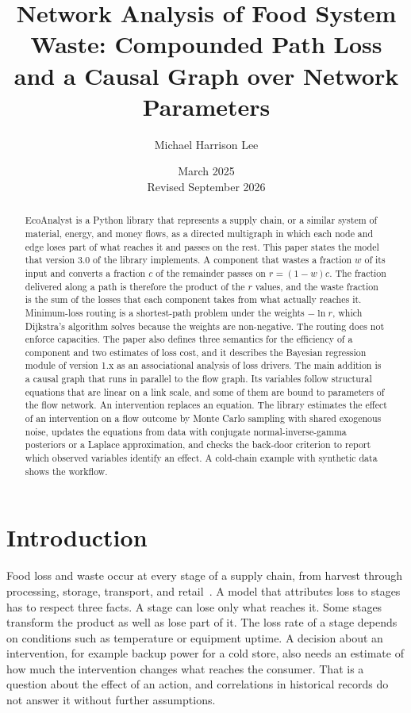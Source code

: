 \documentclass[12pt]{article}
\title{Network Analysis of Food System Waste: Compounded Path Loss and a Causal Graph over Network Parameters}
\author{Michael Harrison Lee}
\date{March 2025\\[2pt] Revised September 2026}
\theoremstyle{plain}
\theoremstyle{definition}
\begin{document}
\maketitle

\begin{abstract}
EcoAnalyst is a Python library that represents a supply chain, or a similar system of material, energy, and money flows, as a directed multigraph in which each node and edge loses part of what reaches it and passes on the rest. This paper states the model that version 3.0 of the library implements. A component that wastes a fraction $w$ of its input and converts a fraction $c$ of the remainder passes on $r=(1-w)c$. The fraction delivered along a path is therefore the product of the $r$ values, and the waste fraction is the sum of the losses that each component takes from what actually reaches it. Minimum-loss routing is a shortest-path problem under the weights $-\ln r$, which Dijkstra's algorithm solves because the weights are non-negative. The routing does not enforce capacities. The paper also defines three semantics for the efficiency of a component and two estimates of loss cost, and it describes the Bayesian regression module of version 1.x as an associational analysis of loss drivers. The main addition is a causal graph that runs in parallel to the flow graph. Its variables follow structural equations that are linear on a link scale, and some of them are bound to parameters of the flow network. An intervention replaces an equation. The library estimates the effect of an intervention on a flow outcome by Monte Carlo sampling with shared exogenous noise, updates the equations from data with conjugate normal-inverse-gamma posteriors or a Laplace approximation, and checks the back-door criterion to report which observed variables identify an effect. A cold-chain example with synthetic data shows the workflow.
\end{abstract}

\section{Introduction}

Food loss and waste occur at every stage of a supply chain, from harvest through processing, storage, transport, and retail~\cite{supply_chain_waste}. A model that attributes loss to stages has to respect three facts. A stage can lose only what reaches it. Some stages transform the product as well as lose part of it. The loss rate of a stage depends on conditions such as temperature or equipment uptime. A decision about an intervention, for example backup power for a cold store, also needs an estimate of how much the intervention changes what reaches the consumer. That is a question about the effect of an action, and correlations in historical records do not answer it without further assumptions.
\end{document}

